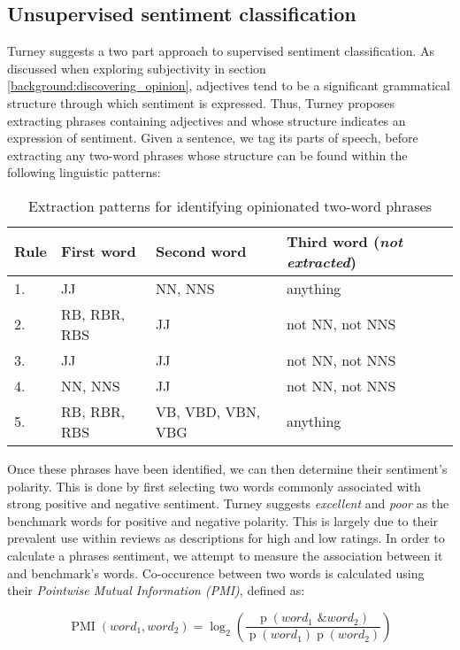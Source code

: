 \subsection{Unsupervised sentiment classification}

Turney \cite{Turney:2002vv} suggests a two part approach to supervised sentiment classification. As discussed when exploring subjectivity in section \ref{background:discovering_opinion}, adjectives tend to be a significant grammatical structure through which sentiment is expressed. Thus, Turney proposes extracting phrases containing adjectives and whose structure indicates an expression of sentiment. Given a sentence, we tag its parts of speech, before extracting any two-word phrases whose structure can be found within the following linguistic patterns:

\begin{table}[h]
	\caption{Extraction patterns for identifying opinionated two-word phrases}
	\label{background:patterns}
	\centering
	\begin{tabular}
		{ l | l l l }
		Rule & First word & Second word & Third word (\emph{not extracted}) \\ \hline
	  1. & JJ & NN, NNS & anything \\
		2. & RB, RBR, RBS & JJ & not NN, not NNS \\
		3. & JJ & JJ & not NN, not NNS \\
		4. & NN, NNS & JJ & not NN, not NNS \\
		5. & RB, RBR, RBS & VB, VBD, VBN, VBG & anything \\
	\end{tabular}
\end{table}

Once these phrases have been identified, we can then determine their sentiment's polarity. This is done by first selecting two words commonly associated with strong positive and negative sentiment. Turney suggests \emph{excellent} and \emph{poor} as the benchmark words for positive and negative polarity. This is largely due to their prevalent use within reviews as descriptions for high and low ratings. In order to calculate a phrases sentiment, we attempt to measure the association between it and benchmark's words. Co-occurence between two words is calculated using their \emph{Pointwise Mutual Information (PMI)}, defined as:

\begin{equation}
	\operatorname{PMI}(word_1, word_2) = \log_2 \left(\frac{\operatorname{p}(word_1 \textit{ \& } word_2)}{\operatorname{p}(word_1)\operatorname{p}(word_2)}\right)
\end{equation}

